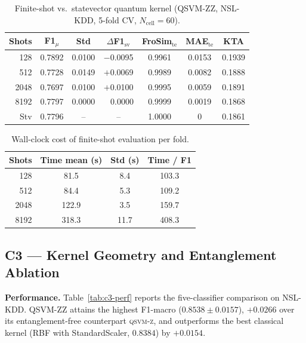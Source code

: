 \documentclass[journal]{IEEEtran}
\newcommand{\ZZ}{\textsc{ZZ}}
\newcommand{\QSVM}{QSVM-\ZZ}
\begin{document}
  \begin{table}[t]
  \centering
  \caption{Finite-shot vs.\ statevector quantum kernel
    (\QSVM{}, NSL-KDD, 5-fold CV, $N_{\text{cell}}{=}60$).}
  \label{tab:c2-shots}
  \scriptsize
  \begin{tabular}{rcccccc}
  \toprule
  Shots & F1$_{\mu}$ & Std & $\Delta$F1$_{\text{sv}}$ & FroSim$_{\text{te}}$ & MAE$_{\text{te}}$ & KTA\\\midrule
  128  & 0.7892 & 0.0100 & $-$0.0095 & 0.9961 & 0.0153 & 0.1939\\
  512  & 0.7728 & 0.0149 & $+$0.0069 & 0.9989 & 0.0082 & 0.1888\\
  2048 & 0.7697 & 0.0100 & $+$0.0100 & 0.9995 & 0.0059 & 0.1891\\
  8192 & 0.7797 & 0.0000 & $\;\;\;0.0000$ & 0.9999 & 0.0019 & 0.1868\\
  Stv  & 0.7796 & --     & --        & 1.0000 & 0      & 0.1861\\
  \bottomrule
  \end{tabular}
  \end{table}

  \begin{table}[t]
  \centering
  \caption{Wall-clock cost of finite-shot evaluation per fold.}
  \label{tab:c2-time}
  \small
  \begin{tabular}{rccc}
  \toprule
  Shots & Time mean (s) & Std (s) & Time / F1\\\midrule
  128  & 81.5  & 8.4  & 103.3\\
  512  & 84.4  & 5.3  & 109.2\\
  2048 & 122.9 & 3.5  & 159.7\\
  8192 & 318.3 & 11.7 & 408.3\\
  \bottomrule
  \end{tabular}
  \end{table}

  \subsection{C3 --- Kernel Geometry and Entanglement Ablation}
  \textbf{Performance.} Table~\ref{tab:c3-perf} reports the
  five-classifier comparison on NSL-KDD. \QSVM{} attains the highest
  F1-macro ($0.8538{\pm}0.0157$), $+0.0266$ over its
  entanglement-free counterpart \textsc{qsvm-z}, and outperforms the
  best classical kernel (RBF with StandardScaler, $0.8384$) by
  $+0.0154$.
\end{document}
